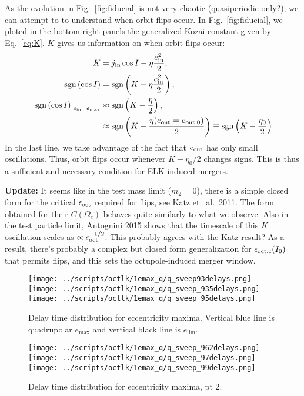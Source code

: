 \documentclass[11pt,
        usenames, %
        dvipsnames %
    ]{article}
\newcommand*{\at}[1]{\left.#1\right|}
\newcommand*{\p}[1]{\left(#1\right)}
\DeclareMathOperator{\sgn}{sgn}
\begin{document}
As the evolution in Fig.~\ref{fig:fiducial} is not very chaotic (quasiperiodic
only?), we can attempt to to understand when orbit flips occur. In
Fig.~\ref{fig:fiducial}, we ploted in the bottom right panels the generalized
Kozai constant given by Eq.~\eqref{eq:K}. $K$ gives us information on when orbit
flips occur:
\begin{align}
    K &= j_{\rm in}\cos I - \eta \frac{e_{\rm in}^2}{2},\\
    \sgn\p{\cos I} &= \sgn\p{K - \eta \frac{e_{\rm in}^2}{2}},\\
    \at{\sgn\p{\cos I}}_{e_{\rm in} = e_{\max}}
        &\approx \sgn\p{K - \frac{\eta}{2}},\nonumber\\
        &\approx \sgn\p{K - \frac{\eta(e_{\rm out} = e_{\rm out, 0})}{2}}
        \equiv \sgn\p{K - \frac{\eta_0}{2}}
\end{align}
In the last line, we take advantage of the fact that $e_{\rm out}$ has only
small oscillations. Thus, orbit flips occur whenever $K - \eta_0/2$ changes
signs. This is thus a sufficient and necessary condition for ELK-induced
mergers.

\textbf{Update:} It seems like in the test mass limit ($m_2 = 0$), there is a
simple closed form for the critical $\epsilon_{\rm oct}$ required for flips, see
Katz et.\ al.\ 2011. The form obtained for their $C(\Omega_e)$ behaves quite
similarly to what we observe. Also in the test particle limit, Antognini 2015
shows that the timescale of this $K$ oscillation scales as $\propto
\epsilon_{\rm oct}^{-1/2}$. This probably agrees with the Katz result? As a
result, there's probably a complex but closed form generalization for
$\epsilon_{\rm oct, c}(I_0)$ that permits flips, and this sets the
octupole-induced merger window.

\begin{figure}
    \centering
    \texttt{[image: ../scripts/octlk/1emax\_q/q\_sweep93delays.png]}
    \texttt{[image: ../scripts/octlk/1emax\_q/q\_sweep\_935delays.png]}
    \texttt{[image: ../scripts/octlk/1emax\_q/q\_sweep\_95delays.png]}
    \caption{Delay time distribution for eccentricity maxima. Vertical blue line
    is quadrupolar $e_{\max}$ and vertical black line is $e_{\lim}$.}\label{fig:delays}
\end{figure}
\begin{figure}
    \centering
    \texttt{[image: ../scripts/octlk/1emax\_q/q\_sweep\_962delays.png]}
    \texttt{[image: ../scripts/octlk/1emax\_q/q\_sweep\_97delays.png]}
    \texttt{[image: ../scripts/octlk/1emax\_q/q\_sweep\_99delays.png]}
    \caption{Delay time distribution for eccentricity maxima, pt 2.}\label{fig:delays2}
\end{figure}
\end{document}

